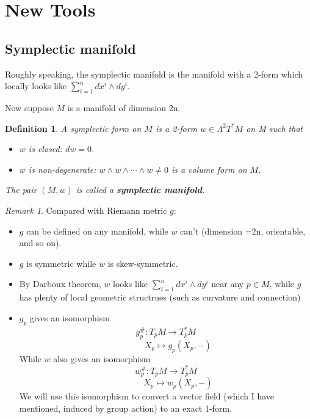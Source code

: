 \documentclass[11pt]{amsart}
\numberwithin{equation}{section}
\theoremstyle{plain}
\newtheorem{defn}[theorem]{Definition}
\theoremstyle{plain}
\numberwithin{equation}{section}
\theoremstyle{remark}
\newtheorem{remark}[theorem]{Remark}
\begin{document}
\section{New Tools} 
\subsection{Symplectic manifold}
Roughly speaking, the symplectic manifold is the manifold with a 2-form which locally looks like $\sum_{i=1}^n dx^i \wedge dy^i$.

Now suppose $M$ is a manifold of dimension 2n.
\begin{defn}
	A symplectic form on $M$ is a 2-form $w \in \Lambda^2 T^*M$ on M such that 
	\begin{itemize}
		\item $w$ is closed: $dw=0$.
		\item $w$ is non-degenerate: $w\wedge w\wedge\cdots \wedge w \neq 0$ is a volume form on $M$.
	\end{itemize}
The pair $(M,w)$ is called a \textbf{symplectic manifold}.	
\end{defn} 
\begin{remark}
	Compared with Riemann metric $g$:
	\begin{itemize}
		\item $g$ can be defined on any manifold, while $w$ can't (dimension =2n, orientable, and so on).
		\item $g$ is symmetric while $w$ is skew-symmetric.
		\item By Darboux theorem,
		$w$ looks like $\sum_{i=1}^n dx^i \wedge dy^i$ near any $p \in M$, while $g$ has plenty of local geometric structrues (such as curvature and connection)
		\item $g_p$ gives an isomorphism
		$$g_p^\# : T_pM \longrightarrow T_p^*M$$
		$$\phantom{g_p:123} X_p \mapsto g_p(X_p,-)$$
		While $w$ also gives an isomorphism
		$$w_p^\# : T_pM \longrightarrow T_p^*M$$
$$\phantom{g_p:123} X_p \mapsto w_p(X_p,-)$$
We will use this isomorphism to convert
a vector field (which I have mentioned, induced by group action) to an exact 1-form.
	\end{itemize}

\end{remark}
\end{document}
